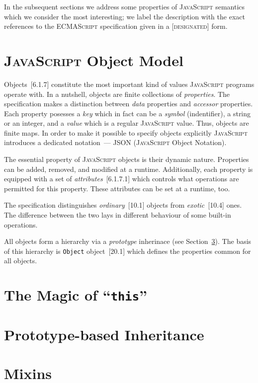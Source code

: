 \documentclass{article}
\newcommand{\js}{\textsc{JavaScript}\xspace}
\newcommand{\es}{\textsc{ECMAScript}\xspace}
\newcommand{\rf}[1]{[\textsc{#1}]}
\begin{document}
In the subsequent sections we address some properties of \js semantics which we consider the most interesting; we
label the description with the exact references to the \es specification given in a \rf{designated} form.

\section{\js Object Model}

Objects~\rf{6.1.7} constitute the most important kind of values \js programs operate with. In a nutshell, objects are
finite collections of \emph{properties}. The specification makes a distinction between \emph{data} properties and \emph{accessor}
properties. Each property posesses a \emph{key} which in fact can be a \emph{symbol}
(indentifier), a string or an integer, and a \emph{value} which is a regular \js value. Thus, objects are finite maps.
In order to make it possible to specify objects explicitly \js introduces a dedicated notation~--- JSON (\js Object Notation).

The essential property of \js objects is their dynamic nature. Properties can be added, removed, and modified at a runtime.
Additionally, each property is equipped with a set of \emph{attributes}~\rf{6.1.7.1} which controls what operations are permitted
for this property. These attributes can be set at a runtime, too.

The specification distinguishes \emph{ordinary}~\rf{10.1} objects from \emph{exotic}~\rf{10.4} ones. The difference between the
two lays in different behaviour of some built-in operations. 

All objects form a hierarchy via a \emph{prototype} inherinace (see Section~\ref{sec:prototype}). The basis of
this hierarchy is \lstinline|Object| object~\rf{20.1} which defines the properties common for all objects.


\section{The Magic of ``\lstinline[basicstyle=\normal]|this|''}

\section{Prototype-based Inheritance}
\label{sec:prototype}

\section{Mixins}
\end{document}
